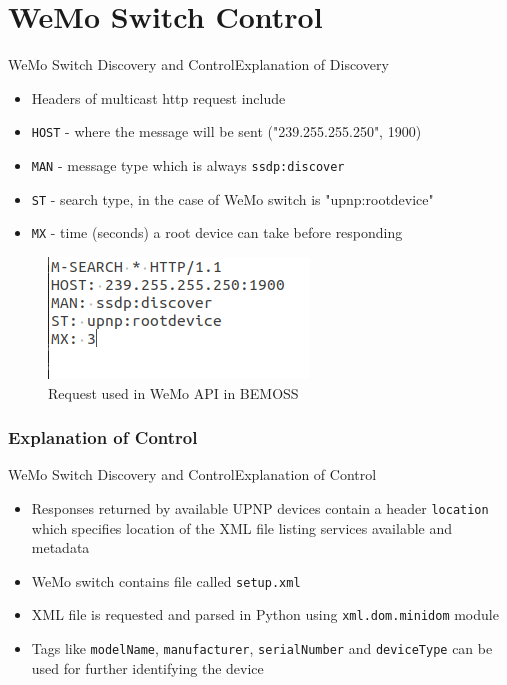 \documentclass{beamer}
\begin{document}
\section{WeMo Switch Control}
\begin{frame}{WeMo Switch Discovery and Control}{Explanation of Discovery}
\begin{itemize}
\item Headers of multicast http request include
\item \texttt{HOST} - where the message will be sent ("239.255.255.250", 1900)
\item \texttt{MAN} - message type which is always \texttt{ssdp:discover}
\item \texttt{ST} - search type, in the case of WeMo switch is "upnp:rootdevice"
\item \texttt{MX} - time (seconds) a root device can take before responding
\end{itemize}
\begin{figure}
\includegraphics[scale=0.5]{figs/img/upnpRequest}
\caption{Request used in WeMo API in BEMOSS}
\end{figure}
\end{frame}

\subsubsection{Explanation of Control}
\begin{frame}{WeMo Switch Discovery and Control}{Explanation of Control}
\begin{itemize}
\item Responses returned by available UPNP devices contain a header \texttt{location} which specifies location of the XML file listing services available and metadata
\item WeMo switch contains file called \texttt{setup.xml}
\item XML file is requested and parsed in Python using \texttt{xml.dom.minidom} module
\item Tags like \texttt{modelName}, \texttt{manufacturer}, \texttt{serialNumber} and \texttt{deviceType} can be used for further identifying the device
\end{itemize}
\end{frame}
\end{document}
